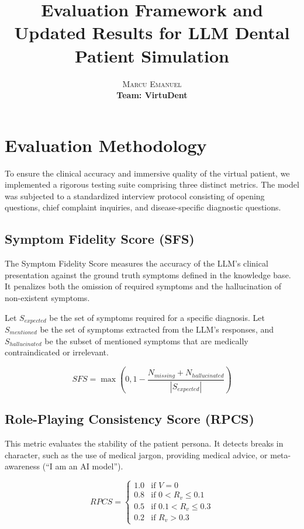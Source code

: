 \documentclass{article}
\title{Evaluation Framework and Updated Results for LLM Dental Patient Simulation}
\author{
  \textsc{Marcu Emanuel}\\[0.4em]
  \normalsize\textbf{Team: VirtuDent}
}
\date{}
\begin{document}
\maketitle

\section{Evaluation Methodology}

To ensure the clinical accuracy and immersive quality of the virtual patient, we implemented a rigorous testing suite comprising three distinct metrics. The model was subjected to a standardized interview protocol consisting of opening questions, chief complaint inquiries, and disease-specific diagnostic questions.

\subsection{Symptom Fidelity Score (SFS)}
The Symptom Fidelity Score measures the accuracy of the LLM's clinical presentation against the ground truth symptoms defined in the knowledge base. It penalizes both the omission of required symptoms and the hallucination of non-existent symptoms.

Let $S_{expected}$ be the set of symptoms required for a specific diagnosis. Let $S_{mentioned}$ be the set of symptoms extracted from the LLM's responses, and $S_{hallucinated}$ be the subset of mentioned symptoms that are medically contraindicated or irrelevant.

\begin{equation}
    SFS = \max\left(0, 1 - \frac{N_{missing} + N_{hallucinated}}{|S_{expected}|}\right)
\end{equation}

\subsection{Role-Playing Consistency Score (RPCS)}
This metric evaluates the stability of the patient persona. It detects breaks in character, such as the use of medical jargon, providing medical advice, or meta-awareness (“I am an AI model”).

\begin{equation}
    RPCS = 
    \begin{cases} 
    1.0 & \text{if } V = 0 \\
    0.8 & \text{if } 0 < R_v \leq 0.1 \\
    0.5 & \text{if } 0.1 < R_v \leq 0.3 \\
    0.2 & \text{if } R_v > 0.3
    \end{cases}
\end{equation}
\end{document}
